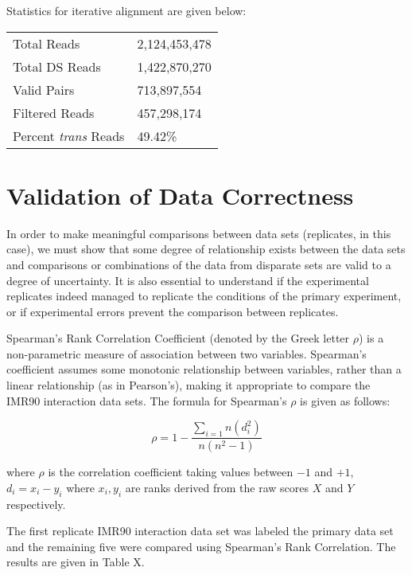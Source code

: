 Statistics for iterative alignment are given below:

\begin{center}
  \begin{table}
    \begin{tabular}{l l}
    Total Reads & 2,124,453,478 \\
    Total DS Reads & 1,422,870,270 \\
    Valid Pairs & 713,897,554 \\
    Filtered Reads & 457,298,174 \\
    Percent \textit{trans} Reads & 49.42\% \\
    \end{tabular}
  \end{table}
\end{center}


\chapter{Validation of Data Correctness}

In order to make meaningful comparisons between data sets (replicates,
in this case), we must show that some degree of relationship exists between
the data sets and comparisons or combinations of the data from disparate sets
are valid to a degree of uncertainty.  It is also essential to understand if the
experimental replicates indeed managed to replicate the conditions of the primary
experiment, or if experimental errors prevent the comparison between replicates.

Spearman's Rank Correlation Coefficient (denoted by the Greek letter $\rho$) is
a non-parametric measure of association between two variables.
Spearman's coefficient assumes some monotonic relationship between variables,
rather than a linear relationship (as in Pearson's), making it appropriate
to compare the IMR90 interaction data sets.  The formula for Spearman's $\rho$ is
given as follows:

\begin{equation}
\rho = 1 - \frac{\sum_{i=1}{n}(d_i^2)}{n(n^2 - 1)}
\end{equation}

where $\rho$ is the correlation coefficient taking values between $-1$ and $+1$,
$d_i = x_i - y_i$ where $x_i, y_i$ are ranks derived from the raw scores $X$ and
$Y$ respectively.

The first replicate IMR90 interaction data set was labeled the primary data set
and the remaining five were compared using Spearman's Rank Correlation.  The
results are given in Table X.

